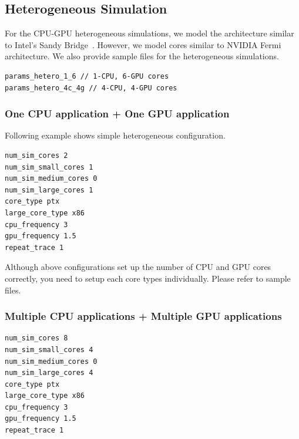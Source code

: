 \subsection{Heterogeneous Simulation}

For the CPU-GPU heterogeneous simulations, we model the architecture
similar to Intel's Sandy Bridge~\cite{sandybridge}. However, we
model \gpu cores similar to NVIDIA Fermi~\cite{fermi} architecture. We
also provide sample files for the heterogeneous simulations.

\begin{Verbatim}
params_hetero_1_6 // 1-CPU, 6-GPU cores
params_hetero_4c_4g // 4-CPU, 4-GPU cores
\end{Verbatim}


\subsubsection{One CPU application + One GPU application}

Following example shows simple heterogeneous configuration.

\begin{Verbatim}
num_sim_cores 2
num_sim_small_cores 1
num_sim_medium_cores 0
num_sim_large_cores 1
core_type ptx
large_core_type x86
cpu_frequency 3
gpu_frequency 1.5
repeat_trace 1
\end{Verbatim}


Although above configurations set up the number of CPU and GPU cores
correctly, you need to setup each core types individually. Please
refer to sample files.

\subsubsection{Multiple CPU applications + Multiple GPU applications}

\begin{Verbatim}
num_sim_cores 8
num_sim_small_cores 4
num_sim_medium_cores 0
num_sim_large_cores 4
core_type ptx
large_core_type x86
cpu_frequency 3
gpu_frequency 1.5
repeat_trace 1
\end{Verbatim}


